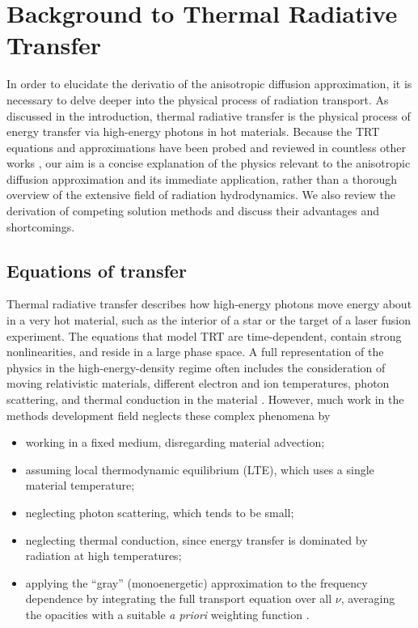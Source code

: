 
\chapter{Background to Thermal Radiative Transfer}\label{chap:trtBackground}

In order to elucidate the derivatio of the anisotropic
diffusion approximation, it is necessary to delve deeper into the physical
process of radiation transport. As discussed in the introduction,
thermal radiative transfer is the physical process of energy transfer via
high-energy photons in hot materials. Because the TRT equations and
approximations have been probed and reviewed in countless other works
\cite{Mih1984,Pom1973,Cas2004,Wol2008}, our aim is a concise explanation of the
physics relevant to the anisotropic diffusion approximation and its immediate
application, rather than a thorough overview of the extensive field of radiation
hydrodynamics. We also review the derivation of competing solution methods and
discuss their advantages and shortcomings.

\section{Equations of transfer}\label{sec:bgTrtEquations}
Thermal radiative transfer describes how high-energy photons move energy about
in a very hot material, such as the interior of a star or the target of a laser
fusion experiment. The equations that model TRT are time-dependent, contain
strong nonlinearities, and reside in a large phase space.
A full representation of the physics in
the high-energy-density regime often includes the consideration of moving
relativistic materials, different electron and ion temperatures, photon
scattering, and thermal conduction in the material \cite{Mih1984}. However,
much work in the methods development field neglects these complex phenomena by
\begin{itemize}
  \item working in a fixed medium, disregarding material advection;
  \item assuming local thermodynamic equilibrium (LTE), which uses a single
    material temperature;
  \item neglecting photon scattering, which tends to be small;
  \item neglecting thermal conduction, since energy transfer is dominated by
    radiation at high temperatures;
  \item applying the ``gray'' (monoenergetic) approximation to the frequency
    dependence by integrating the full transport equation over all $\nu$, averaging 
    the
    opacities with a suitable \emph{a priori} weighting function \cite{Lar1983a}.
\end{itemize}

